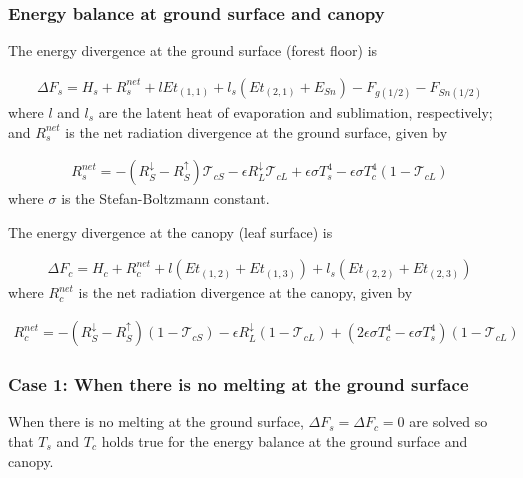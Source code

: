 \hypertarget{energy-balance-at-ground-surface-and-canopy}{%
\subsubsection{Energy balance at ground surface and canopy}\label{energy-balance-at-ground-surface-and-canopy}}

The energy divergence at the ground surface (forest floor) is

\begin{eqnarray}
 \Delta F_s =
  H_s + R^{net}_s + l Et_{(1,1)} + l_s ( Et_{(2,1)} + E_{Sn} )
  - F_{g(1/2)} - F_{Sn(1/2)} \label{eq136}
\end{eqnarray} where \(l\) and \(l_s\) are the latent heat of evaporation and sublimation, respectively; and \(R^{net}_s\) is the net radiation divergence at the ground surface, given by

\begin{eqnarray}
  R^{net}_s = -(R^{\downarrow}_S - R^{\uparrow}_S) {\mathcal{T}}_{cS}
              - \epsilon R^{\downarrow}_L {\mathcal{T}}_{cL}
              + \epsilon \sigma T_s^4
              - \epsilon \sigma T_c^4 (1 - {\mathcal{T}}_{cL})
\end{eqnarray} where \(\sigma\) is the Stefan-Boltzmann constant.

The energy divergence at the canopy (leaf surface) is

\begin{eqnarray}
  \Delta F_c =
  H_c + R^{net}_c + l ( Et_{(1,2)} + Et_{(1,3)} )
  + l_s ( Et_{(2,2)} + Et_{(2,3)} )
\end{eqnarray} where \(R^{net}_c\) is the net radiation divergence at the canopy, given by

\begin{eqnarray}
  R^{net}_c = -(R^{\downarrow}_S - R^{\uparrow}_S) (1-{\mathcal{T}}_{cS})
              - \epsilon R^{\downarrow}_L (1-{\mathcal{T}}_{cL})
              + ( 2 \epsilon \sigma T_c^4
              - \epsilon \sigma T_s^4 ) (1 - {\mathcal{T}}_{cL}) \label{eq139}
\end{eqnarray}

\hypertarget{case-1-when-there-is-no-melting-at-the-ground-surface}{%
\subsubsection{Case 1: When there is no melting at the ground surface}\label{case-1-when-there-is-no-melting-at-the-ground-surface}}

When there is no melting at the ground surface, \(\Delta F_s=\Delta F_c=0\) are solved so that \(T_s\) and \(T_c\) holds true for the energy balance at the ground surface and canopy.

